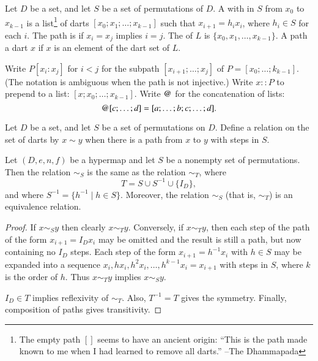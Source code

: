 \begin{definition}[path] 
Let $D$ be a set, and let $S$ be a set of permutations of $D$.
A  with  in $S$
from $x_0$ to $x_{k-1}$ is a list\footnote{The empty path $[]$ seems
to have an ancient origin: ``This is the path made known to me
when I had learned to remove all darts.'' --The Dhammapada} of
darts $[x_0;x_1;\ldots;x_{k-1}]$ such that $x_{i+1} = h_i x_i$,
where $h_i \in S$  for each $i$.    The
path is  if $x_i=x_j$ implies $i=j$. 
The  of $L$ is $\{x_0,x_1,\ldots,x_{k-1}\}$.  A path 
a dart $x$ if $x$ is an element of the dart set of $L$.
\end{definition}

\begin{notation}[$::$,~$\opat$]
Write $P[x_i:x_j]$ for $i<j$ for the subpath $[x_{i+1};\ldots;x_j]$ of
$P=[x_0;\ldots;k_{k-1}]$.  (The notation is ambiguous when the path is
not injective.)  Write $x::P$ to prepend to a list:
$[x;x_0;\ldots;x_{k-1}]$.  Write $\opat$ for the concatenation of
lists:
\begin{displaymath}
[a;\ldots;b] \opat [c;\ldots;d]  = [a;\ldots;b;c;\ldots;d].
\end{displaymath}
\end{notation}
%
%
%


\begin{definition}[$\sim_S$]
Let $D$ be a set, and let $S$ be a 
set of permutations on $D$.
Define a relation on the set of darts by $x\sim y$ when there is a
path from $x$ to $y$ with steps in $S$.
\end{definition}

\begin{lemma}\label{lemma:er} 
Let $(D,e,n,f)$ be a hypermap and let $S$ be a nonempty set of permutations.
Then the relation $\sim_S$ is the same as the relation $\sim_T$, where
\begin{displaymath}
T = S \cup S^{-1} \cup \{I_D\},
\end{displaymath}
and where $S^{-1} = \{h^{-1} \mid h \in S\}$.
Moreover,  the relation $\sim_S$ (that is, $\sim_T$) is an equivalence relation.  
%
\end{lemma}

\begin{proof} If $x\sim_S y$ then clearly $x\sim_T y$.  Conversely,
if $x\sim_T y$, then each step of the path of the form $x_{i+1} = I_D x_{i}$ may be omitted and the result is still a path, but now containing no $I_D$ steps.
Each step of the form $x_{i+1} = h^{-1} x_i$ with $h\in S$ may be expanded into
a sequence  $x_i,h x_{i}, h^2 x_{i},\ldots,h^{k-1} x_{i} = x_{i+1}$ with steps in 
$S$, where $k$ is the order of $h$.  Thus $x\sim_T y$ implies $x\sim_S y$.

$I_D\in T$ implies reflexivity of $\sim_T$.  Also, $T^{-1} = T$ gives the symmetry.  Finally, composition of paths gives transitivity.
\end{proof}

